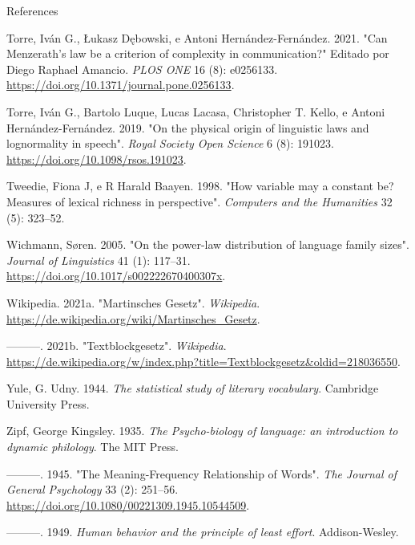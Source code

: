 \documentclass[
  ignorenonframetext,
  aspectratio=169]{beamer}
\newlength{\cslhangindent}
\newlength{\cslentryspacingunit} %
\newenvironment{CSLReferences}[2] %
 {%
  \setlength{\parindent}{0pt}
  \ifodd #1
  \let\oldpar\par
  \def\par{\hangindent=\cslhangindent\oldpar}
  \fi
  \setlength{\parskip}{#2\cslentryspacingunit}
 }%
 {}
\begin{document}
\begin{frame}[allowframebreaks]{References}
\begin{CSLReferences}{1}{0}
\leavevmode{}%
Torre, Iván G., Łukasz Dębowski, e Antoni Hernández-Fernández. 2021.
{"Can Menzerath's law be a criterion of complexity in communication?"}
Editado por Diego Raphael Amancio. \emph{{PLOS} {ONE}} 16 (8): e0256133.
\url{https://doi.org/10.1371/journal.pone.0256133}.

\leavevmode{}%
Torre, Iván G., Bartolo Luque, Lucas Lacasa, Christopher T. Kello, e
Antoni Hernández-Fernández. 2019. {"On the physical origin of linguistic
laws and lognormality in speech"}. \emph{Royal Society Open Science} 6
(8): 191023. \url{https://doi.org/10.1098/rsos.191023}.

\leavevmode{}%
Tweedie, Fiona J, e R Harald Baayen. 1998. {"How variable may a constant
be? Measures of lexical richness in perspective"}. \emph{Computers and
the Humanities} 32 (5): 323--52.

\leavevmode{}%
Wichmann, Søren. 2005. {"On the power-law distribution of language
family sizes"}. \emph{Journal of Linguistics} 41 (1): 117--31.
\url{https://doi.org/10.1017/s002222670400307x}.

\leavevmode{}%
Wikipedia. 2021a. {"Martinsches Gesetz"}. \emph{Wikipedia}.
\url{https://de.wikipedia.org/wiki/Martinsches_Gesetz}.

\leavevmode{}%
---------. 2021b. {"Textblockgesetz"}. \emph{Wikipedia}.
\url{https://de.wikipedia.org/w/index.php?title=Textblockgesetz\&oldid=218036550}.

\leavevmode{}%
Yule, G. Udny. 1944. \emph{The statistical study of literary
vocabulary}. Cambridge University Press.

\leavevmode{}%
Zipf, George Kingsley. 1935. \emph{The Psycho-biology of language: an
introduction to dynamic philology}. The MIT Press.

\leavevmode{}%
---------. 1945. {"The Meaning-Frequency Relationship of Words"}.
\emph{The Journal of General Psychology} 33 (2): 251--56.
\url{https://doi.org/10.1080/00221309.1945.10544509}.

\leavevmode{}%
---------. 1949. \emph{Human behavior and the principle of least
effort}. Addison-Wesley.

\end{CSLReferences}
\end{frame}
\end{document}
